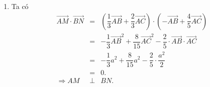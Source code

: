 \begin{bt}
{\begin{enumerate}
{\begin{tikzpicture}[scale=1, line join=round, line cap=round]
	\end{tikzpicture}}
	\item Ta có
	\begin{eqnarray*}
		\vec{AM}\cdot\vec{BN}&=&\left(\dfrac{1}{3}\vec{AB}+\dfrac{2}{3}\vec{AC}\right)\cdot\left(-\vec{AB}+\dfrac{4}{5}\vec{AC}\right)\\
		&=&-\dfrac{1}{3}\vec{AB}^2+\dfrac{8}{15}\vec{AC}^2-\dfrac{2}{5}\cdot\vec{AB}\cdot\vec{AC}\\
		&=&-\dfrac{1}{3}a^2+\dfrac{8}{15}a^2-\dfrac{2}{5}\cdot\dfrac{a^2}{2}\\
		&=&0.\\
		\Rightarrow AM&\perp&BN.
	\end{eqnarray*}
		\end{enumerate}
		
		}
\end{bt}

